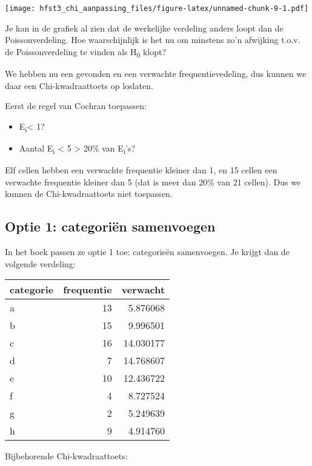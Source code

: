 \documentclass[]{book}
\newenvironment{Shaded}{\begin{snugshade}}{\end{snugshade}}
\newcommand{\KeywordTok}[1]{\textcolor[rgb]{0.13,0.29,0.53}{\textbf{{#1}}}}
\newcommand{\DataTypeTok}[1]{\textcolor[rgb]{0.13,0.29,0.53}{{#1}}}
\newcommand{\OtherTok}[1]{\textcolor[rgb]{0.56,0.35,0.01}{{#1}}}
\newcommand{\NormalTok}[1]{{#1}}
\providecommand{\tightlist}{%
  \setlength{\itemsep}{0pt}\setlength{\parskip}{0pt}}
\theoremstyle{definition}
\theoremstyle{definition}
\theoremstyle{definition}
\theoremstyle{remark}
\begin{document}
\texttt{[image: hfst3\_chi\_aanpassing\_files/figure-latex/unnamed-chunk-9-1.pdf]}

Je kan in de grafiek al zien dat de werkelijke verdeling anders loopt
dan de Poissonverdeling. Hoe waarschijnlijk is het nu om minstens zo'n
afwijking t.o.v. de Poissonverdeling te vinden als H\textsubscript{0}
klopt?

We hebben nu een gevonden en een verwachte frequentievedeling, dus
kunnen we daar een Chi-kwadraattoets op loslaten.

Eerst de regel van Cochran toepassen:

\begin{itemize}
\tightlist
\item
  E\textsubscript{i}\textless{} 1?
\item
  Aantal E\textsubscript{i} \textless{} 5 \textgreater{} 20\% van
  E\textsubscript{i}'s?
\end{itemize}

Elf cellen hebben een verwachte frequentie kleiner dan 1, en 15 cellen
een verwachte frequentie kleiner dan 5 (dat is meer dan 20\% van 21
cellen). Dus we kunnen de Chi-kwadraattoets niet toepassen.

\subsection{Optie 1: categoriën
samenvoegen}\label{optie-1-categoriuxebn-samenvoegen}

In het boek passen ze optie 1 toe: categorieën samenvoegen. Je krijgt
dan de volgende verdeling:

\begin{tabular}{l|r|r}
\hline
categorie & frequentie & verwacht\\
\hline
a & 13 & 5.876068\\
\hline
b & 15 & 9.996501\\
\hline
c & 16 & 14.030177\\
\hline
d & 7 & 14.768607\\
\hline
e & 10 & 12.436722\\
\hline
f & 4 & 8.727524\\
\hline
g & 2 & 5.249639\\
\hline
h & 9 & 4.914760\\
\hline
\end{tabular}

Bijbehorende Chi-kwadraattoets:

\begin{Shaded}
\end{Shaded}
\end{document}
